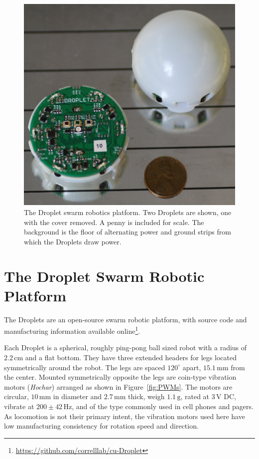 \documentclass[letterpaper, 10pt, conference]{ieeeconf}
\begin{document}
\begin{figure}[!htb]
	\centering
		\includegraphics[width=0.8\columnwidth]{./Images/Droplets.png}
	\caption{The Droplet swarm robotics platform. Two Droplets are shown, one with the cover removed. A penny is included for scale. The background is the floor of alternating power and ground strips from which the Droplets draw power.}
	\label{Droplets}
\end{figure}


\section{The Droplet Swarm Robotic Platform}
The Droplets are an open-source swarm robotic platform, with source code and manufacturing information available online\footnote{\url{https://github.com/correlllab/cu-Droplet}}. 

Each Droplet is a spherical, roughly ping-pong ball sized robot with a radius of $2.2\,\mathrm{cm}$ and a flat bottom. They have three extended headers for legs located symmetrically around the robot. The legs are spaced $120^\circ$ apart, $15.1\, \mathrm{mm}$ from the center. Mounted symmetrically opposite the legs are coin-type vibration motors (\emph{Hochar}) arranged as shown in Figure~\ref{fig:PWMs}. The  motors  are circular, $10\,\mathrm{mm}$ in diameter and $2.7\,\mathrm{mm}$ thick, weigh $1.1\,\mathrm{g}$, rated at $3\,\mathrm{V}$ DC, vibrate at $200\pm42\,\mathrm{Hz}$, and of the type commonly used in cell phones and pagers. As locomotion is not their primary intent, the vibration motors used here have low manufacturing consistency for rotation speed and direction.
\end{document}
